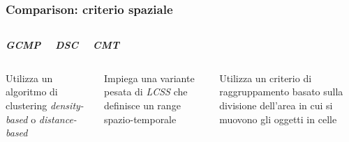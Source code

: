 \documentclass{beamer}
\begin{document}
\begin{frame}
		\frametitle{Comparison: criterio spaziale}
		\begin{columns}
			
			\begin{center}
				\textbf{\textit{\huge{GCMP}}}
				
			\end{center}
		
		\begin{center}
			\textbf{\textit{\huge{DSC}}}
			
		\end{center}
	
	\begin{center}
		\textbf{\textit{\huge{CMT}}}
		
	\end{center}
		\end{columns}
		\begin{columns}
			
			\column{.3\columnwidth}
			
			Utilizza un algoritmo di clustering 
			\textit{density-based} o \textit{distance-based}
		
			
				\column{.3\textwidth}
		
			Impiega una variante pesata di \textit{LCSS} che definisce un range spazio-temporale
			
				\column{.3\textwidth}
			    
				Utilizza un criterio di raggruppamento basato sulla divisione dell'area
				in cui si muovono gli oggetti in celle
		\end{columns}
	\end{frame}     
\end{document}
